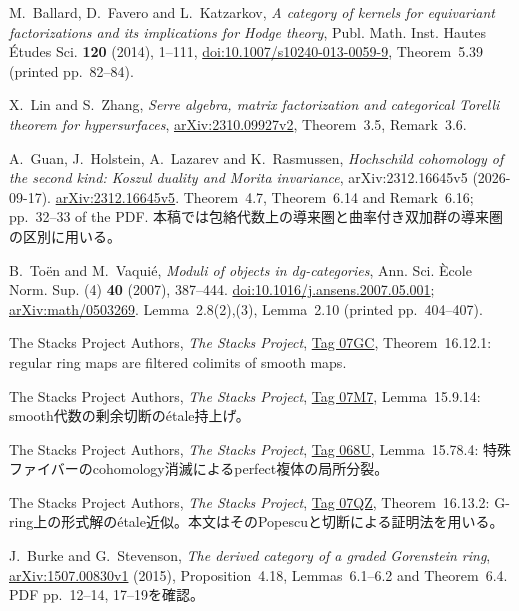 M.~Ballard, D.~Favero and L.~Katzarkov,
\emph{A category of kernels for equivariant factorizations and its implications for Hodge theory},
Publ. Math. Inst. Hautes Études Sci. \textbf{120} (2014), 1--111,
\href{https://doi.org/10.1007/s10240-013-0059-9}{doi:10.1007/s10240-013-0059-9},
Theorem~5.39 (printed pp.~82--84).

X.~Lin and S.~Zhang,
\emph{Serre algebra, matrix factorization and categorical Torelli theorem for hypersurfaces},
\href{https://arxiv.org/abs/2310.09927v2}{arXiv:2310.09927v2},
Theorem~3.5, Remark~3.6.

A.~Guan, J.~Holstein, A.~Lazarev and K.~Rasmussen,
\emph{Hochschild cohomology of the second kind: Koszul duality and Morita invariance},
arXiv:2312.16645v5 (2026-09-17).
\href{https://arxiv.org/abs/2312.16645v5}{arXiv:2312.16645v5}.
Theorem~4.7, Theorem~6.14 and Remark~6.16; pp.~32--33 of the PDF.
本稿では包絡代数上の導来圏と曲率付き双加群の導来圏の区別に用いる。

B.~To\"en and M.~Vaqui\'e,
\emph{Moduli of objects in dg-categories},
Ann. Sci. \`Ecole Norm. Sup. (4) \textbf{40} (2007), 387--444.
\href{https://doi.org/10.1016/j.ansens.2007.05.001}{doi:10.1016/j.ansens.2007.05.001};
\href{https://arxiv.org/abs/math/0503269}{arXiv:math/0503269}.
Lemma~2.8(2),(3), Lemma~2.10 (printed pp.~404--407).

The Stacks Project Authors, \emph{The Stacks Project},
\href{https://stacks.math.columbia.edu/tag/07GC}{Tag 07GC},
Theorem~16.12.1: regular ring maps are filtered colimits of smooth maps.

The Stacks Project Authors, \emph{The Stacks Project},
\href{https://stacks.math.columbia.edu/tag/07M7}{Tag 07M7}, Lemma~15.9.14:
smooth代数の剰余切断の\'etale持上げ。

The Stacks Project Authors, \emph{The Stacks Project},
\href{https://stacks.math.columbia.edu/tag/068U}{Tag 068U}, Lemma~15.78.4:
特殊ファイバーのcohomology消滅によるperfect複体の局所分裂。

The Stacks Project Authors, \emph{The Stacks Project},
\href{https://stacks.math.columbia.edu/tag/07QZ}{Tag 07QZ}, Theorem~16.13.2:
G-ring上の形式解の\'etale近似。本文はそのPopescuと切断による証明法を用いる。

J.~Burke and G.~Stevenson, \emph{The derived category of a graded Gorenstein ring},
\href{https://arxiv.org/abs/1507.00830}{arXiv:1507.00830v1} (2015),
Proposition~4.18, Lemmas~6.1--6.2 and Theorem~6.4.
PDF pp.~12--14, 17--19を確認。


